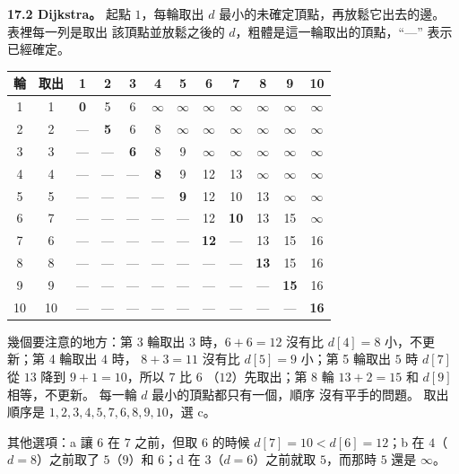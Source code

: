 \begin{pastsoln}
\textbf{17.2 Dijkstra。} 起點 $1$，每輪取出 $d$ 最小的未確定頂點，再放鬆它出去的邊。 表裡每一列是取出
該頂點並放鬆之後的 $d$，粗體是這一輪取出的頂點，``---'' 表示已經確定。
\begin{center}
\small
\setlength{\tabcolsep}{4pt}
\begin{tabular}{cc*{10}{c}}
\toprule
輪 & 取出 & 1 & 2 & 3 & 4 & 5 & 6 & 7 & 8 & 9 & 10 \\
\midrule
1 & 1 & \textbf{0} & 5 & 6 & $\infty$ & $\infty$ & $\infty$ & $\infty$ & $\infty$ & $\infty$ & $\infty$ \\
2 & 2 & --- & \textbf{5} & 6 & 8 & $\infty$ & $\infty$ & $\infty$ & $\infty$ & $\infty$ & $\infty$ \\
3 & 3 & --- & --- & \textbf{6} & 8 & 9 & $\infty$ & $\infty$ & $\infty$ & $\infty$ & $\infty$ \\
4 & 4 & --- & --- & --- & \textbf{8} & 9 & 12 & 13 & $\infty$ & $\infty$ & $\infty$ \\
5 & 5 & --- & --- & --- & --- & \textbf{9} & 12 & 10 & 13 & $\infty$ & $\infty$ \\
6 & 7 & --- & --- & --- & --- & --- & 12 & \textbf{10} & 13 & 15 & $\infty$ \\
7 & 6 & --- & --- & --- & --- & --- & \textbf{12} & --- & 13 & 15 & 16 \\
8 & 8 & --- & --- & --- & --- & --- & --- & --- & \textbf{13} & 15 & 16 \\
9 & 9 & --- & --- & --- & --- & --- & --- & --- & --- & \textbf{15} & 16 \\
10 & 10 & --- & --- & --- & --- & --- & --- & --- & --- & --- & \textbf{16} \\
\bottomrule
\end{tabular}
\end{center}
幾個要注意的地方：第 3 輪取出 $3$ 時，$6 + 6 = 12$ 沒有比 $d[4] = 8$ 小，不更新；第 4 輪取出 $4$ 時，
$8 + 3 = 11$ 沒有比 $d[5] = 9$ 小；第 5 輪取出 $5$ 時 $d[7]$ 從 $13$ 降到 $9 + 1 = 10$，所以 $7$ 比 $6$
（$12$）先取出；第 8 輪 $13 + 2 = 15$ 和 $d[9]$ 相等，不更新。 每一輪 $d$ 最小的頂點都只有一個，順序
沒有平手的問題。 取出順序是 $1, 2, 3, 4, 5, 7, 6, 8, 9, 10$，選 c。

其他選項：a 讓 $6$ 在 $7$ 之前，但取 $6$ 的時候 $d[7] = 10 < d[6] = 12$；b 在 $4$（$d = 8$）之前取了
$5$（$9$）和 $6$；d 在 $3$（$d = 6$）之前就取 $5$，而那時 $5$ 還是 $\infty$。
\end{pastsoln}
